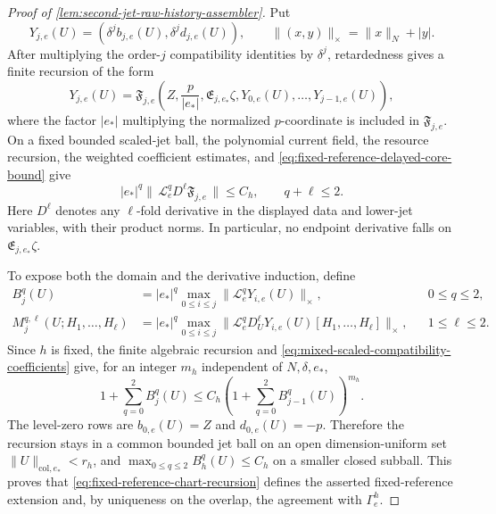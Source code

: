 \begin{proof}[Proof of
\cref{lem:second-jet-raw-history-assembler}]
Put
\[
 Y_{j,e}(U)
 =(\delta^jb_{j,e}(U),\delta^jd_{j,e}(U)),\qquad
 \|(x,y)\|_\times=\|x\|_N+|y|.
\]
After multiplying the order-\(j\) compatibility identities by
\(\delta^j\), retardedness gives a finite recursion of the form
\begin{equation}
 Y_{j,e}(U)
 =\mathfrak F_{j,e}\left(
   Z,\frac p{|e_*|},\mathfrak E_{j,e_*}\zeta,
   Y_{0,e}(U),\ldots,Y_{j-1,e}(U)\right),          \label{eq:mixed-scaled-compatibility-map}
\end{equation}
where the factor \(|e_*|\) multiplying the normalized \(p\)-coordinate is
included in \(\mathfrak F_{j,e}\).  On a fixed bounded scaled-jet ball,
the polynomial current field, the resource recursion, the weighted
coefficient estimates, and
\cref{eq:fixed-reference-delayed-core-bound} give
\begin{equation}
 |e_*|^q\|\,\mathcal L_e^qD^\ell
              \mathfrak F_{j,e}\,\|
 \le C_h,\qquad q+\ell\le2.                       \label{eq:mixed-scaled-compatibility-coefficients}
\end{equation}
Here \(D^\ell\) denotes any \(\ell\)-fold derivative in the displayed data
and lower-jet variables, with their product norms.  In particular, no
endpoint derivative falls on \(\mathfrak E_{j,e_*}\zeta\).

To expose both the domain and the derivative induction, define
\begin{align}
 B_j^q(U)
 &=|e_*|^q\max_{0\le i\le j}
       \|\mathcal L_e^qY_{i,e}(U)\|_\times,
       &&0\le q\le2,                              \label{eq:mixed-background-majorants}\\
 M_j^{q,\ell}(U;H_1,\ldots,H_\ell)
 &=|e_*|^q\max_{0\le i\le j}
 \|\mathcal L_e^qD_U^\ell Y_{i,e}(U)
       [H_1,\ldots,H_\ell]\|_\times,
       &&1\le\ell\le2.                            \label{eq:mixed-data-majorants}
\end{align}
Since \(h\) is fixed, the finite algebraic recursion and
\cref{eq:mixed-scaled-compatibility-coefficients} give, for an integer
\(m_h\) independent of \(N,\delta,e_*\),
\begin{equation}
 1+\sum_{q=0}^2B_j^q(U)
 \le C_h\left(1+\sum_{q=0}^2B_{j-1}^q(U)\right)^{m_h}.
                                                               \label{eq:mixed-background-recurrence}
\end{equation}
The level-zero rows are \(b_{0,e}(U)=Z\) and \(d_{0,e}(U)=-p\).
Therefore the recursion stays in a common bounded jet ball on an open
dimension-uniform set
\(\|U\|_{\mathrm{col},e_*}<r_h\), and
\(\max_{0\le q\le2}B_h^q(U)\le C_h\) on a smaller closed subball.
This proves that \cref{eq:fixed-reference-chart-recursion} defines the
asserted fixed-reference extension and, by uniqueness on the overlap, the
agreement with \(\Gamma_e^h\).


\end{proof}
